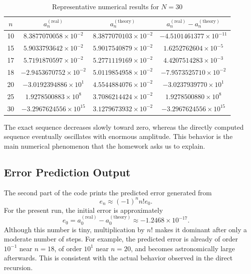 \documentclass[12pt,a4paper]{article}
\begin{document}
\begin{table}[H]
    \centering
    \caption{Representative numerical results for $N=30$}
    \label{tab:key-results}
    \begin{tabular}{cccc}
        \toprule
        $n$ & $a_n^{(\mathrm{real})}$ & $a_n^{(\mathrm{theory})}$ & $a_n^{(\mathrm{real})} - a_n^{(\mathrm{theory})}$ \\
        \midrule
        10 & $8.3877070058\times10^{-2}$ & $8.3877070103\times10^{-2}$ & $-4.5101461377\times10^{-11}$ \\
        15 & $5.9033793642\times10^{-2}$ & $5.9017540879\times10^{-2}$ & $1.6252762604\times10^{-5}$ \\
        17 & $5.7191870597\times10^{-2}$ & $5.2771119169\times10^{-2}$ & $4.4207514283\times10^{-3}$ \\
        18 & $-2.9453670752\times10^{-2}$ & $5.0119854958\times10^{-2}$ & $-7.9573525710\times10^{-2}$ \\
        20 & $-3.0192394886\times10^{1}$ & $4.5544884076\times10^{-2}$ & $-3.0237939770\times10^{1}$ \\
        25 & $1.9278500883\times10^{8}$ & $3.7086214424\times10^{-2}$ & $1.9278500880\times10^{8}$ \\
        30 & $-3.2967624556\times10^{15}$ & $3.1279673932\times10^{-2}$ & $-3.2967624556\times10^{15}$ \\
        \bottomrule
    \end{tabular}
\end{table}

The exact sequence decreases slowly toward zero, whereas the directly computed sequence eventually oscillates with enormous amplitude. This behavior is the main numerical phenomenon that the homework asks us to explain.

\subsection*{Error Prediction Output}

The second part of the code prints the predicted error generated from
\begin{equation}
    e_n \approx (-1)^n n! e_0.
\end{equation}
For the present run, the initial error is approximately
\begin{equation}
    e_0 = a_0^{(\mathrm{real})} - a_0^{(\mathrm{theory})} \approx -1.2468\times 10^{-17}.
\end{equation}
Although this number is tiny, multiplication by $n!$ makes it dominant after only a moderate number of steps. For example, the predicted error is already of order $10^{-1}$ near $n=18$, of order $10^1$ near $n=20$, and becomes astronomically large afterwards. This is consistent with the actual behavior observed in the direct recursion.
\end{document}
